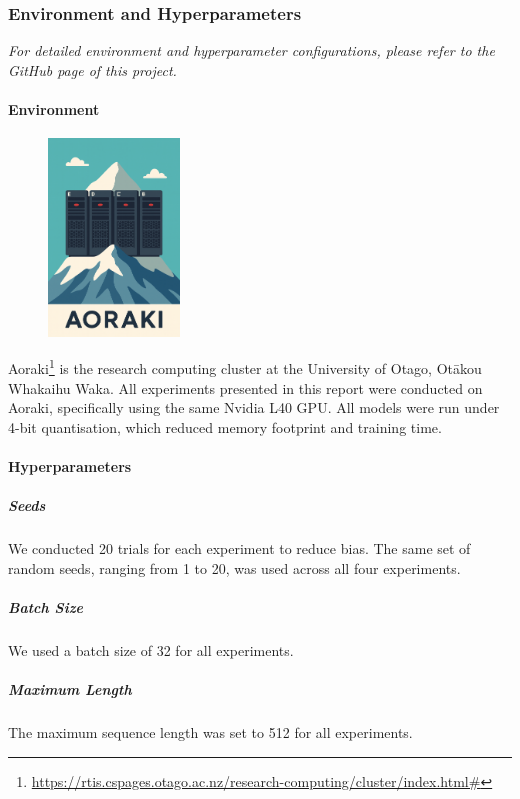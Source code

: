 \documentclass[12pt]{article}
\begin{document}
\subsubsection{Environment and Hyperparameters}

\textit{For detailed environment and hyperparameter configurations, please refer to the GitHub page of this project.}

\paragraph{Environment}
\begin{figure}
  \vspace{-30pt}
  \begin{minipage}{1\linewidth}
    \centering
    \includegraphics[width=3.5cm]{figures/aoraki.png}
  \end{minipage}%
\end{figure}
Aoraki\footnote{\url{https://rtis.cspages.otago.ac.nz/research-computing/cluster/index.html\#}} 
is the research computing cluster at the University of Otago, Otākou Whakaihu Waka. 
All experiments presented in this report were conducted on Aoraki, specifically using the same Nvidia L40 GPU. 
All models were run under 4-bit quantisation, which reduced memory footprint and training time.

\paragraph{Hyperparameters}

\subparagraph{Seeds}
We conducted 20 trials for each experiment to reduce bias. 
The same set of random seeds, ranging from 1 to 20, was used across all four experiments.

\subparagraph{Batch Size}
We used a batch size of 32 for all experiments.

\subparagraph{Maximum Length}
The maximum sequence length was set to 512 for all experiments.
\end{document}
